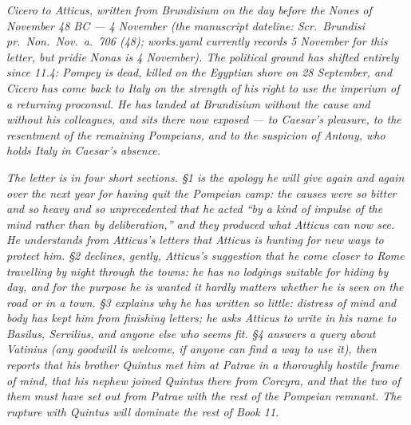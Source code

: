
\textit{Cicero to Atticus, written from Brundisium on the day
before the Nones of November 48 BC --- 4 November (the
manuscript dateline: \textit{Scr.\ Brundisi pr.\ Non.\ Nov.\
a.\ 706 (48)}; \textit{works.yaml} currently records 5 November
for this letter, but \textit{pridie Nonas} is 4 November). The
political ground has shifted entirely since 11.4: Pompey is
dead, killed on the Egyptian shore on 28 September, and Cicero
has come back to Italy on the strength of his right to use the
\textit{imperium} of a returning proconsul. He has landed at
Brundisium without the cause and without his colleagues, and
sits there now exposed --- to Caesar's pleasure, to the resentment
of the remaining Pompeians, and to the suspicion of Antony, who
holds Italy in Caesar's absence.}

\textit{The letter is in four short sections. \S1 is the apology
he will give again and again over the next year for having
quit the Pompeian camp: the causes were so bitter and so heavy
and so unprecedented that he acted ``by a kind of impulse of
the mind rather than by deliberation,'' and they produced what
Atticus can now see. He understands from Atticus's letters
that Atticus is hunting for new ways to protect him. \S2
declines, gently, Atticus's suggestion that he come closer to
Rome travelling by night through the towns: he has no lodgings
suitable for hiding by day, and for the purpose he is wanted
it hardly matters whether he is seen on the road or in a town.
\S3 explains why he has written so little: distress of mind
and body has kept him from finishing letters; he asks Atticus
to write in his name to Basilus, Servilius, and anyone else
who seems fit. \S4 answers a query about Vatinius (any
goodwill is welcome, if anyone can find a way to use it), then
reports that his brother Quintus met him at Patrae in a thoroughly
hostile frame of mind, that his nephew joined Quintus there
from Corcyra, and that the two of them must have set out from
Patrae with the rest of the Pompeian remnant. The rupture with
Quintus will dominate the rest of Book 11.}
